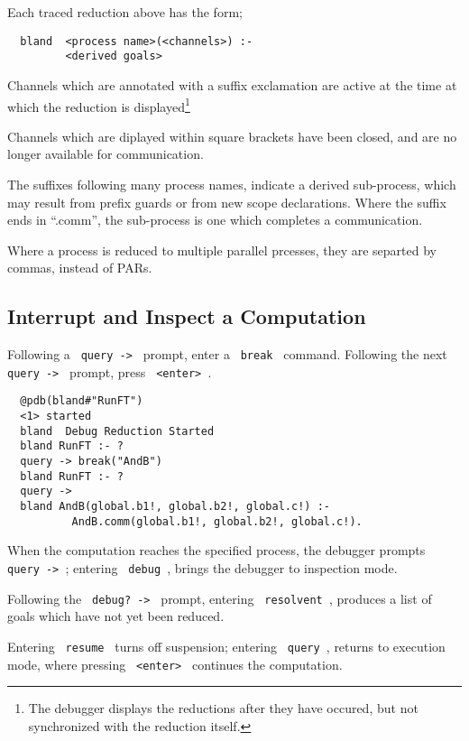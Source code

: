 Each traced reduction above has the form;

\begin{verbatim}
  bland  <process name>(<channels>) :-
         <derived goals>
\end{verbatim}

\noindent
Channels which are annotated with a suffix exclamation are
active at the time at which the reduction is displayed\footnote{
The debugger displays the reductions after they have occured,
but not synchronized with the reduction itself.}

\noindent
Channels which are diplayed within square brackets have been
closed, and are no longer available for communication.

\noindent
The suffixes following many process names, indicate a derived
sub-process, which may result from prefix guards or from new
scope declarations.  Where the suffix ends in ``.comm'', the
sub-process is one which completes a communication.

\noindent
Where a process is reduced to multiple parallel prcesses, they
are separted by commas, instead of PARs.

\subsection{Interrupt and Inspect a Computation}

Following a \verb+ query -> + prompt, enter a \verb+ break + command.
Following the next \verb+ query -> + prompt, press \verb+ <enter> +.

\begin{verbatim}
  @pdb(bland#"RunFT")
  <1> started
  bland  Debug Reduction Started
  bland RunFT :- ?
  query -> break("AndB")
  bland RunFT :- ?
  query -> 
  bland AndB(global.b1!, global.b2!, global.c!) :- 
          AndB.comm(global.b1!, global.b2!, global.c!).
\end{verbatim}

\noindent
When the computation reaches the specified process, the
debugger prompts \verb+ query -> +;
entering \verb+ debug +, brings the debugger
to inspection mode.

\noindent
Following the \verb+ debug? -> + prompt, entering
\verb+ resolvent +, produces a list
of goals which have not yet been reduced.

\noindent
Entering \verb+ resume + turns off suspension;
entering \verb+ query +, returns to execution
mode, where pressing \verb+ <enter> + continues the computation.

